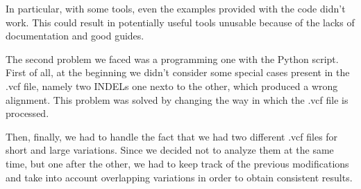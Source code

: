 \documentclass[10pt,a4paper,oneside]{scrartcl}
\begin{document}
	In particular, with some tools, even the examples provided with the code didn't work. This could result in potentially useful tools unusable because of the lacks of documentation and good guides.
	
	The second problem we faced was a programming one with the Python script. First of all, at the beginning we didn't consider some special cases present in the .vcf file, namely two INDELs one nexto to the other, which produced a wrong alignment. This problem was solved by changing the way in which the .vcf file is processed.
	
	Then, finally, we had to handle the fact that we had two different .vcf files for short and large variations. Since we decided not to analyze them at the same time, but one after the other, we had to keep track of the previous modifications and take into account overlapping variations in order to obtain consistent results. 
	
\end{document}
